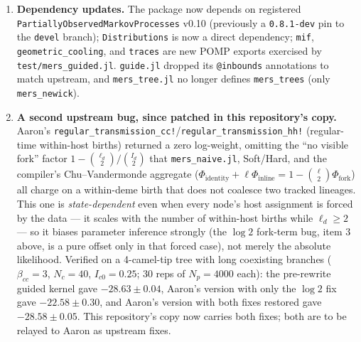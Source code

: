 \documentclass[11pt]{article}
\theoremstyle{plain}
\begin{document}
\begin{enumerate}
to be relayed to Aaron as an upstream fix.
\item \textbf{Dependency updates.} The package now depends on registered
\texttt{PartiallyObservedMarkovProcesses} v0.10 (previously a \texttt{0.8.1-dev} pin to the
\texttt{devel} branch); \texttt{Distributions} is now a direct dependency; \texttt{mif},
\texttt{geometric\_cooling}, and \texttt{traces} are new POMP exports exercised by
\texttt{test/mers\_guided.jl}. \texttt{guide.jl} dropped its \texttt{@inbounds} annotations to
match upstream, and \texttt{mers\_tree.jl} no longer defines \texttt{mers\_trees} (only
\texttt{mers\_newick}).
\item \textbf{A second upstream bug, since patched in this repository's copy.} Aaron's
\texttt{regular\_transmission\_cc!}/\texttt{regular\_transmission\_hh!} (regular-time
within-host births) returned a zero log-weight, omitting the ``no visible fork'' factor
$1-\binom{\ell_d}{2}/\binom{I_d}{2}$ that \texttt{mers\_naive.jl}, Soft/Hard, and the compiler's
Chu--Vandermonde aggregate ($\Phi_{\mathrm{identity}}+\ell\Phi_{\mathrm{inline}}=1-\binom{\ell}{2}\Phi_{\mathrm{fork}}$)
all charge on a within-deme birth that does not coalesce two tracked lineages. This one is
\emph{state-dependent} even when every node's host assignment is forced by the data --- it scales
with the number of within-host births while $\ell_d\ge2$ --- so it biases parameter inference
strongly (the $\log 2$ fork-term bug, item 3 above, is a pure offset only in that forced case), not merely the absolute
likelihood. Verified on a 4-camel-tip tree with long coexisting branches ($\beta_{cc}=3$,
$N_c=40$, $I_{c0}=0.25$; 30 reps of $N_p=4000$ each): the pre-rewrite guided kernel gave
$-28.63\pm0.04$, Aaron's version with only the $\log 2$ fix gave $-22.58\pm0.30$, and Aaron's
version with both fixes restored gave $-28.58\pm0.05$. This repository's copy now carries both
fixes; both are to be relayed to Aaron as upstream fixes.
\end{enumerate}
\end{document}
